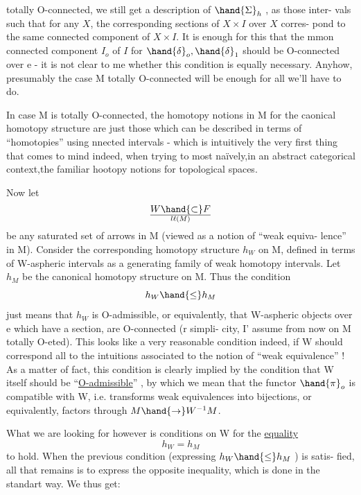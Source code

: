 
totally O-connected,  we still get a description of $\hand{\Sigma}_h$ ,  as those inter-
vals such that for any  $X$, the corresponding sections of $X\times I$ over $X$ corres-
pond to the same connected component of  $X\times I$.  It is enough for this
that the mmon  connected component $I_o$ of $I$ for $\hand{\delta}_o,\hand{\delta}_1$  should be 
O-connected over e  -  it is  not clear to me whether this condition is
equally necessary.  Anyhow,  presumably the case M totally O-connected will
be enough for all we'll have to do.

In case M is totally O-connected,  the homotopy notions in M for the
caonical homotopy structure are just those which can be described in
terms of ``homotopies'' using nnected intervals  -  which is intuitively
the very first thing that comes to mind indeed,  when trying to  
most naïvely,in an abstract categorical context,the familiar hootopy
notions for topological spaces.

Now let
\[ W\hand{\subset} F\over{l}{\ell}(M) \]
be any saturated set of arrows in M  (viewed as a notion of ``weak equiva-%
lence'' in M).  Consider the corresponding homotopy structure $h_W$ on M,
defined in terms of W-aspheric  intervals as a generating family of
weak homotopy intervals.  Let $h_M$  be the canonical homotopy structure
on M.  Thus the condition
\[ h_W \hand{\leq} h_M \]
just means that $h_W$ is O-admissible,  or equivalently,  that W-aspheric
objects over e which have a section,  are  O-connected  (r simpli-%
city,  I' assume from now on M totally O-eted).  This looks like
a very reasonable condition indeed,  if W should correspond  all to the
intuitions associated to the notion of ``weak equivalence'' !  As a matter
of fact,  this condition is clearly implied by the condition that W itself
should be ``\uline{O-admissible}'' ,  by which we mean that the functor $\hand{\pi}_o$ is
compatible with W,  i.e. transforms weak equivalences into bijections,  or
equivalently,  factors through $M\hand{\rightarrow}W^{-1}M$.

What we are looking for however is conditions on W for the \uline{equality}
\[ h_W = h_M \]
to hold.  When the previous condition  (expressing $h_W\hand{\leq}h_M$ )  is satis-%
fied,  all that remains is to express the opposite inequality,  which is
done in the standart way.  We thus get:

